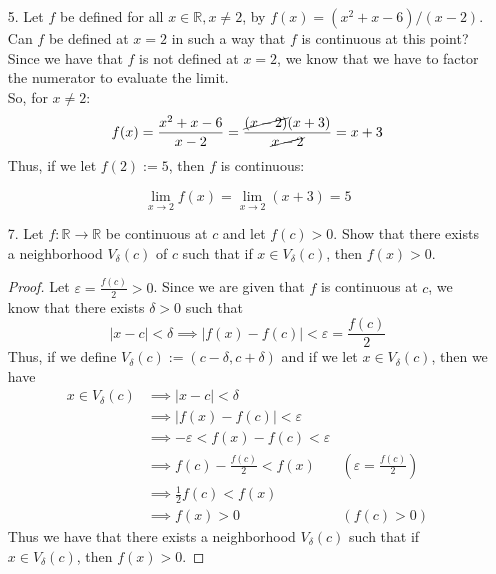 \documentclass[12pt,letterpaper]{article}
\newcommand{\R}{\mathbb{R}}
\theoremstyle{case}
\theoremstyle{definition}
\begin{document}
\begin{enumerate}
\begin{enumerate}
\begin{proof}
				Let $\delta = \frac{1}{n}$. Then we have that $x_n$ is such that $|x-c|<\frac{1}{n}$ and that $|f(x_n)-f(c)| \geq \varepsilon$.\\
				
				$\therefore$ We have a sequence $(x_n)$ such that $\lim\limits_{n \to \infty} x_n = c$ and $\lim\limits_{n \to \infty} f(x_n) \neq f(c)$. Notice however that we have a contradiction here, and thus we have that $f$ is continuous at $c$.
			\end{proof}
			
			\item[5.] Let $f$ be defined for all $x \in \R, x \neq 2$, by $f(x)=(x^2+x-6)/(x-2)$. Can $f$ be defined at $x=2$ in such a way that $f$ is continuous at this point?\\
			
			Since we have that $f$ is not defined at $x=2$, we know that we have to factor the numerator to evaluate the limit.\\
			
			So, for $x \neq 2$:
			\[f(x)=\frac{x^2+x-6}{x-2}=\frac{\cancel{(x-2)}(x+3)}{\cancel{x-2}}=x+3\]
			Thus, if we let $f(2):=5$, then $f$ is continuous:
			
			\[\lim\limits_{x \to 2} f(x) = \lim\limits_{x \to 2} (x+3) = 5\]
			
			\item[7.] Let $f:\R \to \R$ be continuous at $c$ and let $f(c)>0$. Show that there exists a neighborhood $V_\delta (c)$ of $c$ such that if $x \in V_\delta (c)$, then $f(x)>0$.\\
			
			\begin{proof}
				Let $\varepsilon = \frac{f(c)}{2} > 0$. Since we are given that $f$ is continuous at $c$, we know that there exists $\delta > 0$ such that 
				\[|x-c|<\delta \implies |f(x)-f(c)|<\varepsilon = \frac{f(c)}{2}\]
				Thus, if we define $V_\delta (c) := (c-\delta, c+\delta)$ and if we let $x \in V_\delta (c)$, then we have 
				\begin{align*}
					x \in V_\delta (c) &\implies |x-c|<\delta \\
					&\implies |f(x)-f(c)|<\varepsilon \\
					&\implies -\varepsilon < f(x)-f(c)<\varepsilon \\
					&\implies f(c)-\frac{f(c)}{2} < f(x) &(\varepsilon = \frac{f(c)}{2}) \\
					&\implies \frac{1}{2}f(c) < f(x) \\
					&\implies f(x)>0 &(f(c)>0)
				\end{align*}
				Thus we have that there exists a neighborhood $V_\delta(c)$ such that if $x \in V_\delta (c)$, then $f(x)>0$.
			\end{proof}
			

\end{enumerate}
\end{enumerate}
\end{document}
